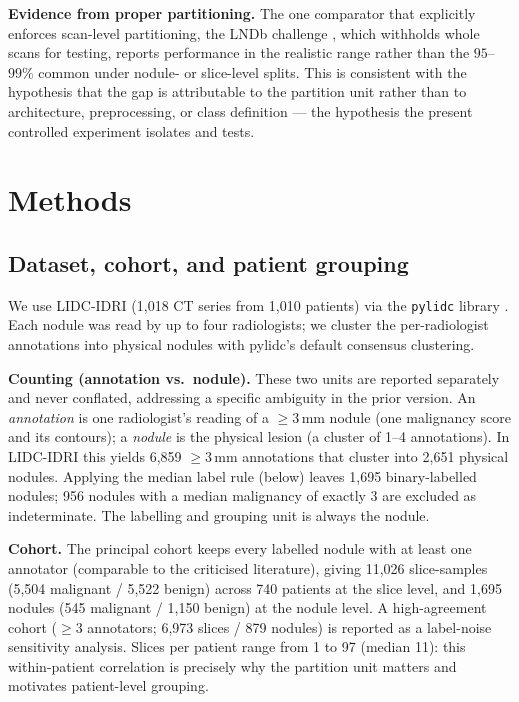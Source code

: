 \documentclass{article}
\newcommand{\vcite}[1]{\cite{#1}}
\begin{document}
\textbf{Evidence from proper partitioning.} The one comparator that explicitly enforces scan-level
partitioning, the LNDb challenge \vcite{pedrosa2021}, which withholds whole scans for testing,
reports performance in the realistic range rather than the $95$--$99\%$ common under nodule- or
slice-level splits. This is consistent with the hypothesis that the gap is attributable to the
partition unit rather than to architecture, preprocessing, or class definition --- the hypothesis the
present controlled experiment isolates and tests.

\section{Methods}

\subsection{Dataset, cohort, and patient grouping}
We use LIDC-IDRI \vcite{armato2011} (1{,}018 CT series from 1{,}010 patients) via the \texttt{pylidc}
library \vcite{hancock2016}. Each nodule was read by up to four radiologists; we cluster the
per-radiologist annotations into physical nodules with pylidc's default consensus clustering.

\textbf{Counting (annotation vs.\ nodule).} These two units are reported separately and never
conflated, addressing a specific ambiguity in the prior version. An \emph{annotation} is one
radiologist's reading of a $\geq 3$\,mm nodule (one malignancy score and its contours); a
\emph{nodule} is the physical lesion (a cluster of 1--4 annotations). In LIDC-IDRI this yields
6{,}859 $\geq 3$\,mm annotations that cluster into 2{,}651 physical nodules. Applying the median
label rule (below) leaves 1{,}695 binary-labelled nodules; 956 nodules with a median malignancy of
exactly 3 are excluded as indeterminate. The labelling and grouping unit is always the nodule.

\textbf{Cohort.} The principal cohort keeps every labelled nodule with at least one annotator
(comparable to the criticised literature), giving 11{,}026 slice-samples (5{,}504 malignant /
5{,}522 benign) across 740 patients at the slice level, and 1{,}695 nodules (545 malignant /
1{,}150 benign) at the nodule level. A high-agreement cohort ($\geq 3$ annotators; 6{,}973 slices /
879 nodules) is reported as a label-noise sensitivity analysis. Slices per patient range from 1 to
97 (median 11): this within-patient correlation is precisely why the partition unit matters and
motivates patient-level grouping.
\end{document}
